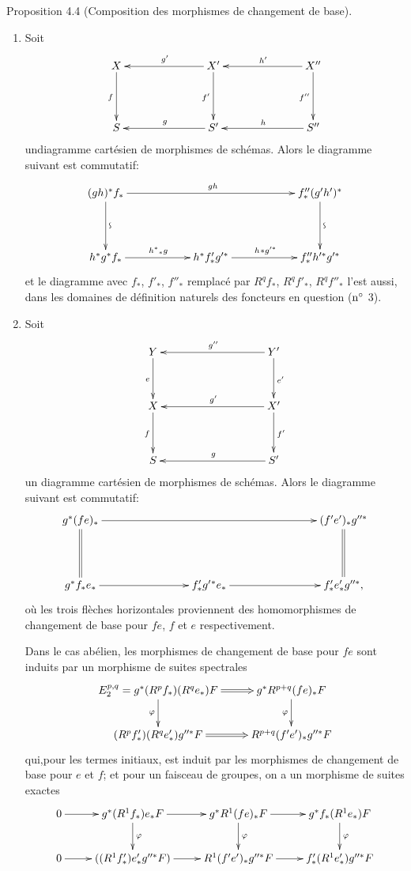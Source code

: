 \documentclass[10pt]{../fichiers-configuration-latex/smfart}
\begin{document}
\begin{enonce*}{Proposition 4.4}
(Composition des morphismes de changement de base).
\begin{enumerate}
\renewcommand{\theenumi}{\roman{enumi}}
\renewcommand{\labelenumi}{(\theenumi)}
\item Soit
$$
\xymatrix@C=2.5cm@R=1.5cm{
X   \ar[d]_{f}& X' \ar[l]_{g'} \ar[d]_{f'} & X'' \ar[l]_{h'}\ar[d]_{f''}\\
S   & S' \ar[l]_{g} &  S''\ar[l]_{h}
}
$$
un\pageoriginale diagramme cartésien de morphismes de schémas. Alors
le diagramme suivant est commutatif:
$$
\xymatrix@C=2cm@R=1.5cm{
(gh)^{\ast}f_{\ast}  \ar[rr]^{gh} \ar[d]^{\text{\rotatebox{90}{$\backsim$}}}& &f''_{\ast}(g'h')^{\ast}\ar[d]^{\text{\rotatebox{90}{$\backsim$}}}\\
h^{\ast}g^{\ast}f_{\ast} \ar[r]^{h^{\ast}{}_{\ast}g} &
h^{\ast}f'_{\ast}g'^{\ast} \ar[r]^{h ^{}\ast g'^{\ast}} &
f''_{\ast}h'^{\ast}g'^{\ast}}
$$
et le diagramme avec $f_{\ast}$, $f'_{\ast}$, $f''_{\ast}$ remplacé par
$R^qf_{\ast}$, $R^q{f'}_{\ast}$, $R^q{f''}_{\ast}$ l'est aussi, dans
les domaines de définition naturels des foncteurs en question {\rm
  (\cf ${\rm n^{\circ}}$ 3).}

\item Soit
$$
\xymatrix@C=3.25cm@R=1.25cm{
Y \ar[d]_{e}& Y'\ar[l]_{g''} \ar[d]^{e'}\\
X \ar[d]_{f}& X'\ar[l]_{g'}\ar[d]^{f'}\\
S & S'\ar[l]_{g}
}$$
un diagramme cartésien de morphismes de schémas. Alors le diagramme
suivant est commutatif:
$$
\xymatrix@C=2.75cm@R=1.5cm{
g^{\ast}(fe)_{\ast} \ar[rr]\ar@{=}[d]& & (f'e')_{\ast}g''^{\ast}\ar@{=}[d]\\
g^{\ast}f_{\ast}e_{\ast}   \ar[r] &f'_{\ast}g'{}^{\ast}e_{\ast} \ar[r] 
&f'_{\ast}e'_{\ast}g''^{\ast},
}
$$
où les trois flèches horizontales proviennent des homomorphismes de
changement de base pour $fe$, $f$ et $e$ respectivement.

Dans le cas abélien, les morphismes de changement de base pour $fe$
sont induits par un morphisme de suites spectrales
$$
\xymatrix{
E^{p,q}_2 = g^{\ast}(R^p f_{\ast})(R^{q} e_{\ast})F \ar@{=>}[r] \ar[d]_{\varphi}&
g^{\ast}R^{p+q}(fe)_{\ast}F\ar[d]_{{\varphi}}\\
(R^{p}f'_{\ast})(R^q e'_{\ast})g''^{\ast}F \ar@{=>}[r]& R^{p+q}(f'e')_{\ast}g''^{\ast}F
}
$$
qui,\pageoriginale pour les termes initiaux, est induit par les
morphismes de changement de base pour $e$ et $f$; et pour un faisceau
de groupes, on a un morphisme de suites exactes
$$
\xymatrix{
0  \ar[r] & g^{\ast}(R^{1}f_{\ast})e_{\ast}F \ar[r]\ar[d]^{\varphi} &
g^{\ast}R^{1}(fe)_{\ast}F \ar[r] \ar[d]^{\varphi}&
g^{\ast}f_{\ast}(R^{1}e_{\ast})F \ar[d]^{\varphi}\\
0 \ar[r]& ((R^{1}f'_{\ast})e'_{\ast}g''^{\ast}F) \ar[r] &
R^1(f' e')_{\ast}g''^{\ast}F  \ar[r] & f'_{\ast}(R^{1}e'_{\ast})g''^{\ast}F
}
$$
\end{enumerate}
\end{enonce*}
\end{document}
